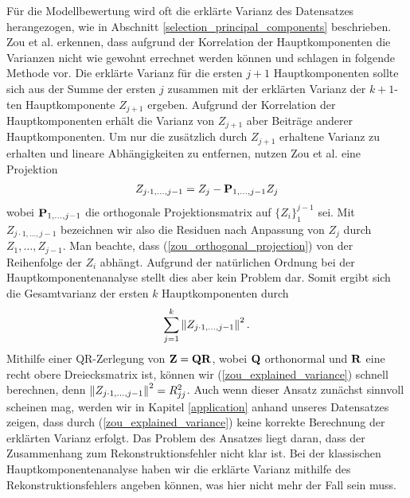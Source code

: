 Für die Modellbewertung wird oft die erklärte Varianz des Datensatzes herangezogen, wie in Abschnitt \ref{selection_principal_components} beschrieben. Zou et al. erkennen, dass aufgrund der Korrelation der Hauptkomponenten die Varianzen nicht wie gewohnt errechnet werden können und schlagen in \cite{zou_sparsepca} folgende Methode vor. Die erklärte Varianz für die ersten $j+1$ Hauptkomponenten sollte sich aus der Summe der ersten $j$ zusammen mit der erklärten Varianz der $k+1$-ten Hauptkomponente $Z_{j+1}$ ergeben. Aufgrund der Korrelation der Hauptkomponenten erhält die Varianz von $Z_{j+1}$ aber Beiträge anderer Hauptkomponenten. Um nur die zusätzlich durch $Z_{j+1}$ erhaltene Varianz zu erhalten und lineare Abhängigkeiten zu entfernen, nutzen Zou et al. eine Projektion
\begin{align}
\label{zou_orthogonal_projection}
Z_{j\cdot 1, \ldots, j-1} = Z_j - \mathbf{P}_{1, \ldots, j-1}Z_j
\end{align}
wobei $\mathbf{P}_{1, \ldots, j-1}$ die orthogonale Projektionsmatrix auf $\{Z_i\}_1^{j-1}$ sei. Mit $Z_{j\cdot 1, \ldots, j-1}$ bezeichnen wir also die Residuen nach Anpassung von $Z_j$ durch $Z_1, \ldots, Z_{j-1}$. Man beachte, dass (\ref{zou_orthogonal_projection}) von der Reihenfolge der $Z_i$ abhängt. Aufgrund der natürlichen Ordnung bei der Hauptkomponentenanalyse stellt dies aber kein Problem dar.
Somit ergibt sich die Gesamtvarianz der ersten $k$ Hauptkomponenten durch 
\begin{align}
\label{zou_explained_variance}
\sum_{j=1}^k \left\lVert Z_{j\cdot 1, \ldots, j-1} \right\rVert^2.
\end{align}
Mithilfe einer QR-Zerlegung von $\mathbf{Z} = \mathbf{Q} \mathbf{R}$, wobei $\mathbf{Q}$ orthonormal und $\mathbf{R}$ eine recht obere Dreiecksmatrix ist, können wir (\ref{zou_explained_variance}) schnell berechnen, denn $\left\lVert Z_{j\cdot 1, \ldots, j-1} \right\rVert^2 = R_{jj}^2$. Auch wenn dieser Ansatz zunächst sinnvoll scheinen mag, werden wir in Kapitel \ref{application} anhand unseres Datensatzes zeigen, dass durch (\ref{zou_explained_variance}) keine korrekte Berechnung der erklärten Varianz erfolgt. Das Problem des Ansatzes liegt daran, dass der Zusammenhang zum Rekonstruktionsfehler nicht klar ist. Bei der klassischen Hauptkomponentenanalyse haben wir die erklärte Varianz mithilfe des Rekonstruktionsfehlers angeben können, was hier nicht mehr der Fall sein muss. 

